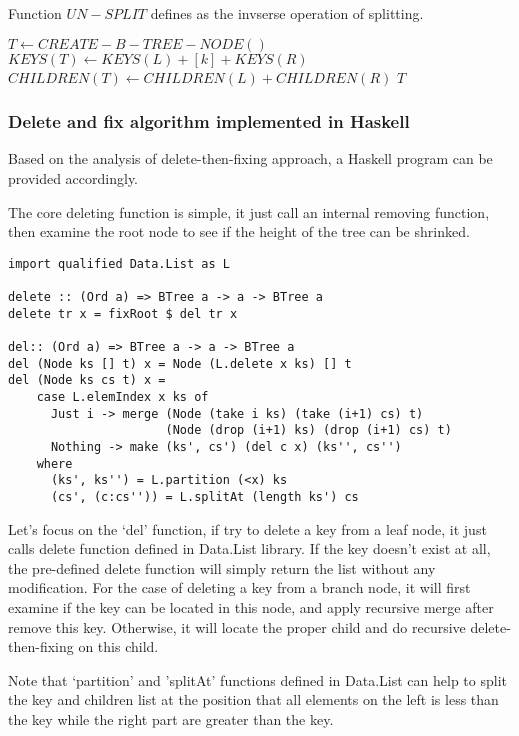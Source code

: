 \documentclass{article}
\begin{document}
Function $UN-SPLIT$ defines as the invserse operation of splitting.

\begin{algorithmic}[1]
  \State $T \gets CREATE-B-TREE-NODE()$
  \State $KEYS(T) \gets KEYS(L)+[k]+KEYS(R)$
  \State $CHILDREN(T) \gets CHILDREN(L)+CHILDREN(R)$
  \State \Return $T$
\EndFunction
\end{algorithmic}

\subsubsection{Delete and fix algorithm implemented in Haskell}
Based on the analysis of delete-then-fixing approach, a Haskell
program can be provided accordingly.

The core deleting function is simple, it just call an internal
removing function, then examine the root node to see if the 
height of the tree can be shrinked.

\lstset{language=Haskell}
\begin{lstlisting}
import qualified Data.List as L

delete :: (Ord a) => BTree a -> a -> BTree a
delete tr x = fixRoot $ del tr x

del:: (Ord a) => BTree a -> a -> BTree a
del (Node ks [] t) x = Node (L.delete x ks) [] t
del (Node ks cs t) x = 
    case L.elemIndex x ks of
      Just i -> merge (Node (take i ks) (take (i+1) cs) t) 
                      (Node (drop (i+1) ks) (drop (i+1) cs) t)
      Nothing -> make (ks', cs') (del c x) (ks'', cs'')
    where
      (ks', ks'') = L.partition (<x) ks
      (cs', (c:cs'')) = L.splitAt (length ks') cs
\end{lstlisting} %

Let's focus on the `del' function, if try to delete a key from
a leaf node, it just calls delete function defined in Data.List
library. If the key doesn't exist at all, the pre-defined
delete function will simply return the list without any modification.
For the case of deleting a key from a branch node, it will first examine
if the key can be located in this node, and apply recursive merge
after remove this key. Otherwise, it will locate the proper child
and do recursive delete-then-fixing on this child.

Note that `partition' and 'splitAt' functions defined in Data.List
can help to split the key and children list at the position that
all elements on the left is less than the key while the right part
are greater than the key.
\end{document}
